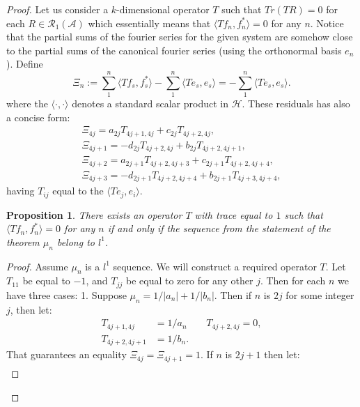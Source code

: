\documentclass[12pt]{article}
\renewcommand{\cal}[1]{\mathcal{#1}}
\newtheorem{prop}{Proposition}
\theoremstyle{definition}
\numberwithin{remark}{section}
\numberwithin{theorem}{section}
\numberwithin{prop}{section}
\numberwithin{equation}{section}
\numberwithin{lemma}{section}
\numberwithin{prop_under_lemma}{lemma}
\begin{document}
    \begin{proof}
        Let us consider a $k$-dimensional operator $T$ such that 
        $Tr(TR) = 0$ for each $R \in \cal{R}_1(\cal{A})$ which essentially means that
        $\langle Tf_n, f_n^* \rangle = 0$ for any $n$. 
        Notice that the partial sums of the fourier series for the given system are somehow close to the
        partial sums of the canonical fourier series (using the orthonormal basis $e_n$). Define
        $$
          \Xi_n := \sum_1^n \langle Tf_s, f_s^* \rangle - \sum_1^n \langle Te_s, e_s \rangle = -\sum_1^n \langle Te_s, e_s \rangle.
        $$
        where the $\langle \cdot, \cdot\rangle$ denotes a standard scalar product in $\cal{H}$.
        These residuals has also a concise form:
        \begin{align*}
            \Xi_{4j} = a_{2j} T_{4j+1, 4j} + c_{2j} T_{4j+2, 4j},\\
            \Xi_{4j + 1} = -d_{2j} T_{4j+2, 4j} + b_{2j} T_{4j+2, 4j+1},\\
            \Xi_{4j + 2} = a_{2j+1} T_{4j+2, 4j+3} + c_{2j+1} T_{4j+2, 4j+4},\\
            \Xi_{4j + 3} = -d_{2j+1} T_{4j+2, 4j+4} + b_{2j+1} T_{4j+3, 4j+4},
        \end{align*}
        having $T_{ij}$ equal to the $\langle Te_j, e_i\rangle$.
        \begin{prop}
            \label{inf-dim-statement}
            There exists an operator $T$ with trace equal to $1$ such that
            $\langle Tf_n, f_n^*\rangle = 0$ for any $n$ if and only if the
            sequence from the statement of the theorem $\mu_n$ belong to $l^1$.
        \end{prop}
        \begin{proof}
            Assume $\mu_n$ is a $l^1$ sequence. We will construct a required operator $T$.
            Let $T_{11}$ be equal to $-1$, and $T_{jj}$ be equal to zero for any other $j$.
            Then for each $n$ we have three cases:
            1. Suppose $\mu_n = 1/|a_n| + 1/|b_n|$. Then if $n$ is $2j$ for some integer $j$, then
            let:
            \begin{align*}
                T_{4j+1,4j}&=1/a_n & \quad T_{4j+2,4j} = 0,\\
                T_{4j+2,4j+1}&=1/b_n.
            \end{align*}
            That guarantees an equality $\Xi_{4j} = \Xi_{4j+1} = 1$.
            If $n$ is $2j+1$ then let:
            \begin{align*}

\end{align*}
\end{proof}
\end{proof}
\end{document}
